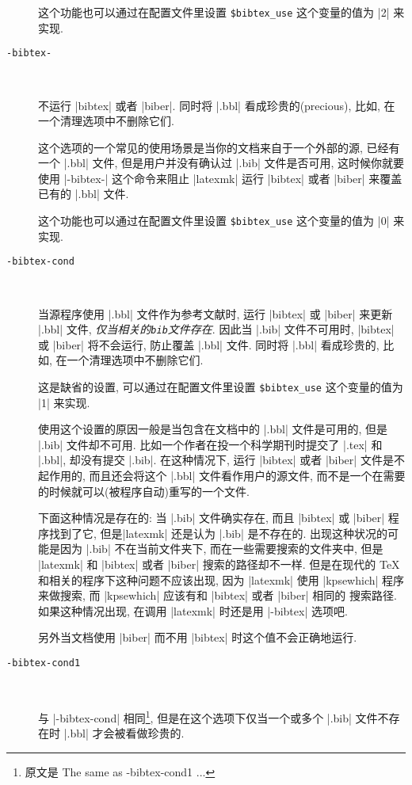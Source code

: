 \documentclass{ctexart}
\begin{document}
\begin{description}
		这个功能也可以通过在配置文件里设置 \verb|$bibtex_use| 这个变量的值为 |2| 来实现.

		\item[\texttt{-bibtex-}]~
		
		不运行 |bibtex| 或者 |biber|. 同时将 |.bbl| 看成珍贵的(precious), 比如, 在一个清理选项中不删除它们.
		
		这个选项的一个常见的使用场景是当你的文档来自于一个外部的源, 已经有一个 |.bbl| 文件, 但是用户并没有确认过 |.bib| 文件是否可用, 这时候你就要使用 |-bibtex-| 这个命令来阻止 |latexmk| 运行 |bibtex| 或者 |biber| 来覆盖已有的 |.bbl| 文件.

		这个功能也可以通过在配置文件里设置 \verb|$bibtex_use| 这个变量的值为 |0| 来实现.

		\item[\texttt{-bibtex-cond}]~
		
		当源程序使用 |.bbl| 文件作为参考文献时, 运行 |bibtex| 或 |biber| 来更新 |.bbl| 文件, \emph{仅当相关的\texttt{bib}文件存在}. 因此当 |.bib| 文件不可用时, |bibtex| 或 |biber| 将不会运行, 防止覆盖 |.bbl| 文件. 同时将 |.bbl| 看成珍贵的, 比如, 在一个清理选项中不删除它们.

		这是缺省的设置, 可以通过在配置文件里设置 \verb|$bibtex_use| 这个变量的值为 |1| 来实现.

		使用这个设置的原因一般是当包含在文档中的 |.bbl| 文件是可用的, 但是 |.bib| 文件却不可用. 比如一个作者在投一个科学期刊时提交了 |.tex| 和 |.bbl|, 却没有提交 |.bib|. 在这种情况下, 运行 |bibtex| 或者 |biber| 文件是不起作用的, 而且还会将这个 |.bbl| 文件看作用户的源文件, 而不是一个在需要的时候就可以(被程序自动)重写的一个文件.

		\begin{Remark}
			下面这种情况是存在的: 当 |.bib| 文件确实存在, 而且 |bibtex| 或 |biber| 程序找到了它, 但是|latexmk| 还是认为 |.bib| 是不存在的. 出现这种状况的可能是因为 |.bib| 不在当前文件夹下, 而在一些需要搜索的文件夹中, 但是 |latexmk| 和 |bibtex| 或者 |biber| 搜索的路径却不一样. 但是在现代的 \TeX 和相关的程序下这种问题不应该出现, 因为 |latexmk| 使用 |kpsewhich| 程序来做搜索, 而 |kpsewhich| 应该有和 |bibtex| 或者 |biber| 相同的 搜索路径. 如果这种情况出现, 在调用 |latexmk| 时还是用 |-bibtex| 选项吧.
		\end{Remark}

		另外当文档使用 |biber| 而不用 |bibtex| 时这个值不会正确地运行. 

		\item[\texttt{-bibtex-cond1}]~
		
		与 |-bibtex-cond| 相同\footnote{原文是 The same as -bibtex-cond1 ... }, 但是在这个选项下仅当一个或多个 |.bib| 文件不存在时 |.bbl| 才会被看做珍贵的. 
		

\end{description}
\end{document}
